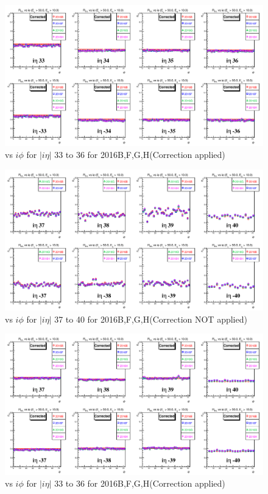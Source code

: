 \begin{figure}[h!]
\centering
\includegraphics[width=0.99\linewidth]{../Figures/Chap2/ImageFiles_HF/Ratio/2016/Corrected/ieta33_36_E1E2Cut3Ietaiphi_Crrtd}
\caption{\ratiosl vs $i\phi$ for $|i\eta|$ 33 to 36 for 2016B,F,G,H(Correction applied)}
\label{fig:ieta33_36_E1E2Cut3Ietaiphi_Crrtd}
\end{figure}
\newpage
\begin{figure}[h!]
\centering
\includegraphics[width=0.99\linewidth]{../Figures/Chap2/ImageFiles_HF/Ratio/2016/Corrected/ieta37_40_E1E2Cut3Ietaiphi}
\caption{\ratiosl vs $i\phi$ for $|i\eta|$ 37 to 40 for 2016B,F,G,H(Correction NOT applied)}
\label{fig:ieta37_40_E1E2Cut3Ietaiphi}
\end{figure}
\begin{figure}[h!]
\centering
\includegraphics[width=0.99\linewidth]{../Figures/Chap2/ImageFiles_HF/Ratio/2016/Corrected/ieta37_40_E1E2Cut3Ietaiphi_Crrtd}
\caption{\ratiosl vs $i\phi$ for $|i\eta|$ 33 to 36 for 2016B,F,G,H(Correction applied)}
\label{fig:ieta37_40_E1E2Cut3Ietaiphi_Crrtd}
\end{figure}
